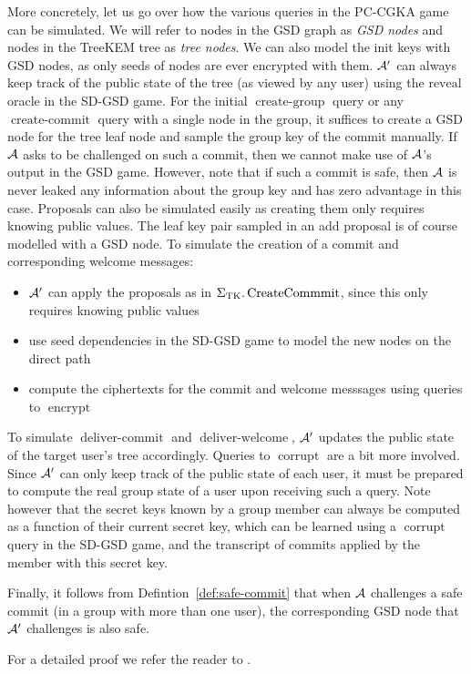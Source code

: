 More concretely, let us go over how the various queries in the PC-CGKA game can be simulated. We will refer to nodes in the GSD graph as \emph{GSD nodes} and nodes in the TreeKEM tree as \emph{tree nodes}. We can also model the init keys with GSD nodes, as only seeds of nodes are ever encrypted with them. $\mathcal{A}'$ can always keep track of the public state of the tree (as viewed by any user) using the $\mathrm{reveal}$ oracle in the SD-GSD game. For the initial $\operatorname{create-group}$ query or any $\operatorname{create-commit}$ query with a single node in the group, it suffices to create a GSD node for the tree leaf node and sample the group key of the commit manually. If $\mathcal{A}$ asks to be challenged on such a commit, then we cannot make use of $\mathcal{A}$'s output in the GSD game. However, note that if such a commit is safe, then $\mathcal{A}$ is never leaked any information about the group key and has zero advantage in this case. Proposals can also be simulated easily as creating them only requires knowing public values. The leaf key pair sampled in an add proposal is of course modelled with a GSD node. To simulate the creation of a commit and corresponding welcome messages:
\begin{itemize}
	\item $\mathcal{A}'$ can apply the proposals as in $\Sigma_{\mathrm{TK}}.\operatorname{CreateCommmit}$, since this only requires knowing public values
	\item use seed dependencies in the SD-GSD game to model the new nodes on the direct path
	\item compute the ciphertexts for the commit and welcome messsages using queries to $\operatorname{encrypt}$
\end{itemize}
To simulate $\operatorname{deliver-commit}$ and $\operatorname{deliver-welcome}$, $\mathcal{A}'$ updates the public state of the target user's tree accordingly. Queries to $\operatorname{corrupt}$ are a bit more involved. Since $\mathcal{A}'$ can only keep track of the public state of each user, it must be prepared to compute the real group state of a user upon receiving such a query. Note however that the secret keys known by a group member can always be computed as a function of their current secret key, which can be learned using a $\operatorname{corrupt}$ query in the SD-GSD game, and the transcript of commits applied by the member with this secret key.

Finally, it follows from Defintion~\ref{def:safe-commit} that when $\mathcal{A}$ challenges a safe commit (in a group with more than one user), the corresponding GSD node that $\mathcal{A}'$ challenges is also safe.

For a detailed proof we refer the reader to \cite[Theorem 12]{modular-group-messaging}.
